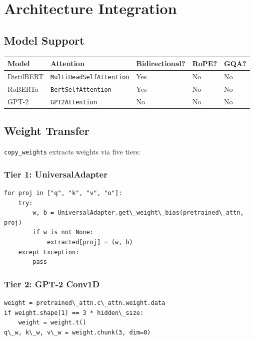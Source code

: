 \section{Architecture Integration}

\subsection{Model Support}

\begin{table}[H]
\centering
\small
\begin{tabular}{lllll}
\toprule
\textbf{Model} & \textbf{Attention} & \textbf{Bidirectional?} & \textbf{RoPE?} & \textbf{GQA?} \\
\midrule
DistilBERT & \texttt{MultiHeadSelfAttention} & Yes & No & No \\
RoBERTa & \texttt{BertSelfAttention} & Yes & No & No \\
GPT-2 & \texttt{GPT2Attention} & No & No & No \\
\bottomrule
\end{tabular}
\end{table}

\subsection{Weight Transfer}

\texttt{copy\_weights} extracts weights via five tiers:

\subsubsection{Tier 1: UniversalAdapter}

\begin{lstlisting}
for proj in ["q", "k", "v", "o"]:
    try:
        w, b = UniversalAdapter.get\_weight\_bias(pretrained\_attn, proj)
        if w is not None:
            extracted[proj] = (w, b)
    except Exception:
        pass
\end{lstlisting}

\subsubsection{Tier 2: GPT-2 Conv1D}

\begin{lstlisting}
weight = pretrained\_attn.c\_attn.weight.data
if weight.shape[1] == 3 * hidden\_size:
    weight = weight.t()
q\_w, k\_w, v\_w = weight.chunk(3, dim=0)
\end{lstlisting}

